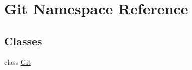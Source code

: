 \hypertarget{namespace_git}{\section{Git Namespace Reference}
\label{namespace_git}
}
\subsection*{Classes}
\begin{DoxyCompactItemize}
\item 
class \hyperlink{class_git_1_1_git}{Git}
\end{DoxyCompactItemize}
